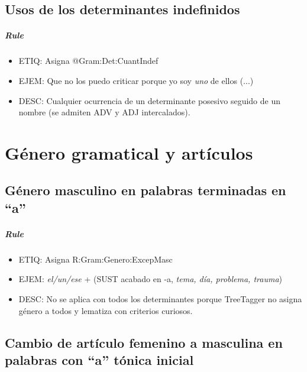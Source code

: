 \documentclass[11pt]{report}
\begin{document}
\section{Usos de los determinantes indefinidos}
\paragraph*{Rule}
\begin{itemize}
\item ETIQ: Asigna @Gram:Det:CuantIndef
\item EJEM: Que no los puedo criticar porque yo soy \emph{uno} de ellos (...)
\item DESC: Cualquier ocurrencia de un determinante posesivo seguido de un nombre (se admiten ADV y ADJ intercalados).
\end{itemize}

\chapter{Género gramatical y artículos}
\section{Género masculino en palabras terminadas en ``a''}
\paragraph*{Rule}
\begin{itemize}
\item ETIQ: Asigna R:Gram:Genero:ExcepMasc
\item EJEM: \emph{el/un/ese} + (SUST acabado en -a, \emph{tema, día, problema, trauma})
\item DESC: No se aplica con todos los determinantes porque TreeTagger no asigna género a todos y lematiza con criterios curiosos.
\end{itemize}

\section{Cambio de artículo femenino a masculina en palabras con ``a'' tónica inicial}
\end{document}
